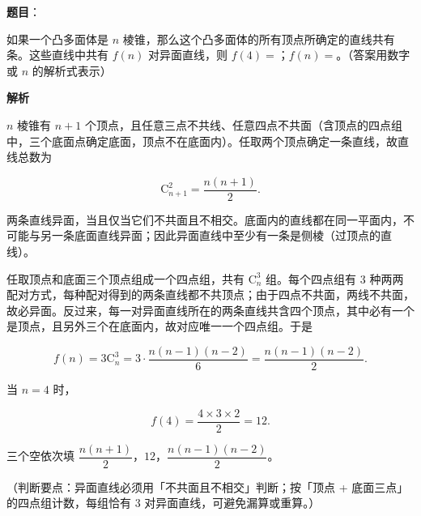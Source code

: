 \begin{answer}

\textbf{题目}：

如果一个凸多面体是 $n$ 棱锥，那么这个凸多面体的所有顶点所确定的直线共有\gkblank{}条。这些直线中共有 $f(n)$ 对异面直线，则 $f(4)=$\gkblank{}；$f(n)=$\gkblank{}。（答案用数字或 $n$ 的解析式表示）
\nopagebreak[4]
\begin{center}\end{center}
\nopagebreak[4]
\textbf{解析}

$n$ 棱锥有 $n+1$ 个顶点，且任意三点不共线、任意四点不共面（含顶点的四点组中，三个底面点确定底面，顶点不在底面内）。任取两个顶点确定一条直线，故直线总数为

\nopagebreak[4]
\[\mathrm C_{n+1}^2=\frac{n(n+1)}{2}.\]

两条直线异面，当且仅当它们不共面且不相交。底面内的直线都在同一平面内，不可能与另一条底面直线异面；因此异面直线中至少有一条是侧棱（过顶点的直线）。

任取顶点和底面三个顶点组成一个四点组，共有 $\mathrm C_n^3$ 组。每个四点组有 $3$ 种两两配对方式，每种配对得到的两条直线都不共顶点；由于四点不共面，两线不共面，故必异面。反过来，每一对异面直线所在的两条直线共含四个顶点，其中必有一个是顶点，且另外三个在底面内，故对应唯一一个四点组。于是

\nopagebreak[4]
\[f(n)=3\mathrm C_n^3=3\cdot\frac{n(n-1)(n-2)}{6}=\frac{n(n-1)(n-2)}{2}.\]

当 $n=4$ 时，

\nopagebreak[4]
\[f(4)=\frac{4\times3\times2}{2}=12.\]

三个空依次填 $\dfrac{n(n+1)}{2}$，$12$，$\dfrac{n(n-1)(n-2)}{2}$。

（判断要点：异面直线必须用「不共面且不相交」判断；按「顶点 + 底面三点」的四点组计数，每组恰有 $3$ 对异面直线，可避免漏算或重算。）


\end{answer}
